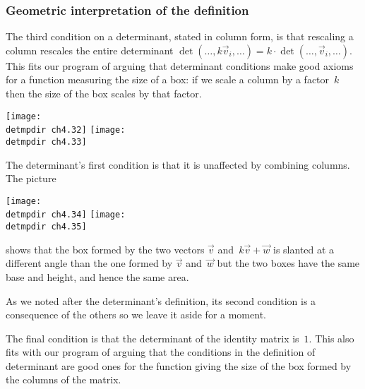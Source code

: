 \begin{frame}\vspace*{-1ex}
  \frametitle{Geometric interpretation of the definition}
The third condition on a determinant, stated in column form, is 
that rescaling a column rescales the entire determinant
$\det(\ldots,k\vec{v}_i,\ldots)=k\cdot\det(\ldots,\vec{v}_i,\ldots)$.
This fits our program of arguing that determinant conditions make
good axioms for a function measuring the size of a box:
if we scale a column by a factor~$k$ then the size of the box
scales by that factor. 
\begin{center}
  \texttt{[image: \\detmpdir ch4.32]}
  \qquad
  \texttt{[image: \\detmpdir ch4.33]}
\end{center}

\pause
The determinant's first condition is that it is unaffected by 
combining columns.
The picture 
\begin{center}
  \texttt{[image: \\detmpdir ch4.34]}
  \quad
  \texttt{[image: \\detmpdir ch4.35]}
\end{center}   
shows that the box
formed by the two vectors $\vec{v}$ and~$k\vec{v}+\vec{w}$ 
is slanted at a different angle than the one formed
by $\vec{v}$ and~$\vec{w}$ but the two boxes have
the same base and height, and hence the same area.
\end{frame}
\begin{frame}
As we noted after the determinant's definition, 
its second condition is a consequence of the 
others so we leave it aside for a moment.  

The final condition is that the determinant of the identity matrix is~$1$.
This also fits 
with our program of arguing that the conditions in the 
definition of determinant are good ones for the function
giving the size of the box formed by the columns of the matrix.
\end{frame}




